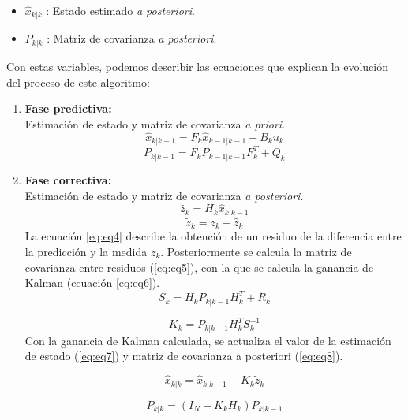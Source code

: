 \begin{itemize}
\item $\hat{x}_{k|k}$ : Estado estimado \textit{a posteriori}.
\item $P_{k|k}$ : Matriz de covarianza \textit{a posteriori}.
\end{itemize}
\bigskip

Con estas variables, podemos describir las ecuaciones que explican la evoluci\'on del proceso de este algoritmo:
\begin{enumerate}
\item \textbf{Fase predictiva:}\\
Estimaci\'on de estado y matriz de covarianza \textit{a priori}.
\begin{equation}
\hat{x}_{k|k-1} = F_k \hat{x}_{k-1|k-1} + B_k u_k
\label{eq:eq1}
\end{equation}
\begin{equation}
P_{k|k-1} = F_{k}P_{k-1|k-1}F_k^{T} + Q_k 
\label{eq:eq2}
\end{equation}
\item \textbf{Fase correctiva:}\\
Estimaci\'on de estado y matriz de covarianza \textit{a posteriori}.
\begin{equation}
\hat{z}_k = H_{k} \hat{x}_{k|k-1}
\label{eq:eq3}
\end{equation}
\begin{equation}
\tilde{z}_k=z_k - \hat{z}_k
\label{eq:eq4}
\end{equation}
La ecuaci\'on \ref{eq:eq4} describe la obtenci\'on de un residuo de la diferencia entre la predicci\'on y la medida $z_k$. Posteriormente se calcula la matriz de covarianza entre residuos (\ref{eq:eq5}), con la que se calcula la ganancia de Kalman (ecuaci\'on \ref{eq:eq6}).
\begin{equation}
S_k = H_k P_{k|k-1} H_{k}^T + R_k
\label{eq:eq5}
\end{equation}

\begin{equation}
K_k = P_{k|k-1} H_k^T S_k^{-1}
\label{eq:eq6}
\end{equation}
Con la ganancia de Kalman calculada, se actualiza el valor de la estimaci\'on de estado (\ref{eq:eq7}) y matriz de covarianza a posteriori (\ref{eq:eq8}). 

\begin{equation}
\hat{x}_{k|k} = \hat{x}_{k|k-1} + K_k \tilde{z}_k
\label{eq:eq7}
\end{equation}

\begin{equation}
P_{k|k} = (I_N - K_kH_k)P_{k|k-1}
\label{eq:eq8}
\end{equation}
\bigskip

\end{enumerate}

